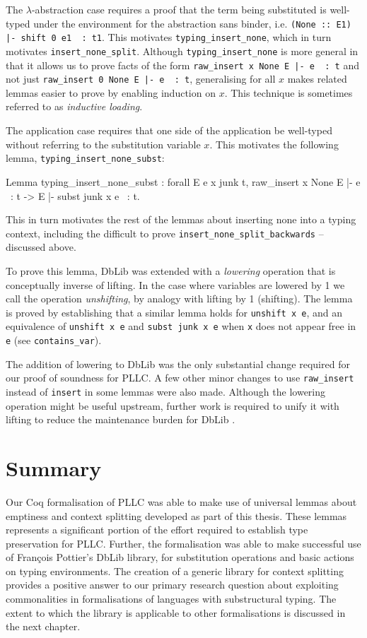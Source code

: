 \documentclass[]{unswthesis}
\newcommand{\Francois}{Fran\frenchc{c}ois }
\let\frenchc\c
\let\c\texttt
\let\i\textit
\begin{document}
The $\lambda$-abstraction case requires a proof that the term being substituted is well-typed under the environment for the abstraction sans binder, i.e. \c{(None :: E1) |- shift 0 e1 ~: t1}. This motivates \c{typing_insert_none}, which in turn motivates \c{insert_none_split}. Although \c{typing_insert_none} is more general in that it allows us to prove facts of the form \c{raw_insert x None E |- e ~: t} and not just \c{raw_insert 0 None E |- e ~: t}, generalising for all $x$ makes related lemmas easier to prove by enabling induction on $x$. This technique is sometimes referred to as \i{inductive loading}.

The application case requires that one side of the application be well-typed without referring to the substitution variable $x$. This motivates the following lemma, \c{typing_insert_none_subst}:

\begin{coqcode}
Lemma typing_insert_none_subst : forall E e x junk t,
  raw_insert x None E |- e ~: t ->
  E |- subst junk x e ~: t.
\end{coqcode}

This in turn motivates the rest of the lemmas about inserting none into a typing context, including the difficult to prove \c{insert_none_split_backwards} -- discussed above.

To prove this lemma, DbLib was extended with a \i{lowering} operation that is conceptually inverse of lifting. In the case where variables are lowered by 1 we call the operation \i{unshifting}, by analogy with lifting by 1 (shifting). The lemma is proved by establishing that a similar lemma holds for \c{unshift x e}, and an equivalence of \c{unshift x e} and \c{subst junk x e} when \c{x} does not appear free in \c{e} (see \c{contains_var}).

The addition of lowering to DbLib was the only substantial change required for our proof of soundness for PLLC. A few other minor changes to use \c{raw_insert} instead of \c{insert} in some lemmas were also made. Although the lowering operation might be useful upstream, further work is required to unify it with lifting to reduce the maintenance burden for DbLib \cite{dblibPullRequest}.

\section{Summary}

Our Coq formalisation of PLLC was able to make use of universal lemmas about emptiness and context splitting developed as part of this thesis. These lemmas represents a significant portion of the effort required to establish type preservation for PLLC. Further, the formalisation was able to make successful use of \Francois Pottier's DbLib library, for substitution operations and basic actions on typing environments. The creation of a generic library for context splitting provides a positive answer to our primary research question about exploiting commonalities in formalisations of languages with substructural typing. The extent to which the library is applicable to other formalisations is discussed in the next chapter.
\end{document}
